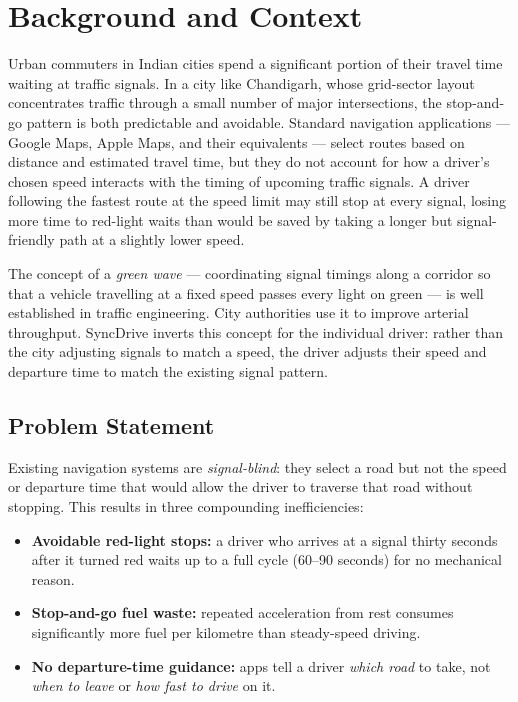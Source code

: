 \documentclass[12pt,a4paper]{report}
\begin{document}
\section{Background and Context}

Urban commuters in Indian cities spend a significant portion of their travel
time waiting at traffic signals. In a city like Chandigarh, whose grid-sector
layout concentrates traffic through a small number of major intersections, the
stop-and-go pattern is both predictable and avoidable. Standard navigation
applications --- Google Maps, Apple Maps, and their equivalents --- select
routes based on distance and estimated travel time, but they do not account for
how a driver's chosen speed interacts with the timing of upcoming traffic
signals. A driver following the fastest route at the speed limit may still stop
at every signal, losing more time to red-light waits than would be saved by
taking a longer but signal-friendly path at a slightly lower speed.

The concept of a \textit{green wave} --- coordinating signal timings along a
corridor so that a vehicle travelling at a fixed speed passes every light on
green --- is well established in traffic engineering. City authorities use it to
improve arterial throughput. SyncDrive inverts this concept for the individual
driver: rather than the city adjusting signals to match a speed, the driver
adjusts their speed and departure time to match the existing signal pattern.

\subsection{Problem Statement}

Existing navigation systems are \textit{signal-blind}: they select a road but
not the speed or departure time that would allow the driver to traverse that
road without stopping. This results in three compounding inefficiencies:

\begin{itemize}
  \item \textbf{Avoidable red-light stops:} a driver who arrives at a signal
    thirty seconds after it turned red waits up to a full cycle (60--90
    seconds) for no mechanical reason.
  \item \textbf{Stop-and-go fuel waste:} repeated acceleration from rest
    consumes significantly more fuel per kilometre than steady-speed driving.
  \item \textbf{No departure-time guidance:} apps tell a driver \textit{which
    road} to take, not \textit{when to leave} or \textit{how fast to drive} on
    it.
\end{itemize}
\end{document}
